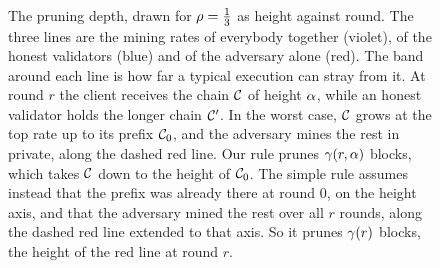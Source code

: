 \begin{figure}[t]
\caption{The pruning depth, drawn for $\rho=\frac{1}{3}$ as height against
round. The three lines are the mining rates of everybody together (violet), of
the honest validators (blue) and of the adversary alone (red). The band
around each line is how far a typical execution can stray from it. At round
$r$ the client receives the chain $\mathcal{C}$ of height $\alpha$, while an honest
validator holds the longer chain $\mathcal{C}'$. In the worst case, $\mathcal{C}$ grows at the
top rate up to its prefix $\mathcal{C}_0$, and the adversary mines the rest in
private, along the dashed red line. Our rule prunes $\gamma(r,\alpha)$ blocks,
which takes $\mathcal{C}$ down to the height of $\mathcal{C}_0$. The simple rule assumes
instead that the prefix was already there at round $0$, on the height axis, and
that the adversary mined the rest over all $r$ rounds, along the dashed red line
extended to that axis. So it prunes $\gamma(r)$ blocks, the height of the red
line at round $r$.}\label{fig.rates}
\end{figure}
